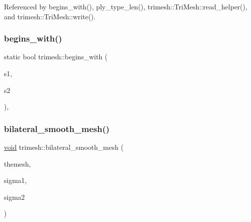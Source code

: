 Referenced by begins\+\_\+with(), ply\+\_\+type\+\_\+len(), trimesh\+::\+Tri\+Mesh\+::read\+\_\+helper(), and trimesh\+::\+Tri\+Mesh\+::write().

\mbox{\label{namespacetrimesh_a34d80be5fbd2f6df95fb17d680510222}} 
\subsubsection{\texorpdfstring{begins\+\_\+with()}{begins\_with()}\hspace{0.1cm}{\footnotesize\ttfamily [2/2]}}
{\footnotesize\ttfamily static bool trimesh\+::begins\+\_\+with (\begin{DoxyParamCaption}\item[{const \+::std\+::string \&}]{s1,  }\item[{const \+::std\+::string \&}]{s2 }\end{DoxyParamCaption})\hspace{0.3cm}{\ttfamily [inline]}, {\ttfamily [static]}}

\mbox{\label{namespacetrimesh_a7ceff7daca94fc7bdb7f39fdd7f4324b}} 
\subsubsection{\texorpdfstring{bilateral\+\_\+smooth\+\_\+mesh()}{bilateral\_smooth\_mesh()}}
{\footnotesize\ttfamily \hyperlink{namespacetrimesh_a784ddfd979e1c579bda795a8edfc3f43}{void} trimesh\+::bilateral\+\_\+smooth\+\_\+mesh (\begin{DoxyParamCaption}\item[{\hyperlink{classtrimesh_1_1TriMesh}{Tri\+Mesh} $\ast$}]{themesh,  }\item[{float}]{sigma1,  }\item[{float}]{sigma2 }\end{DoxyParamCaption})}

\mbox{\label{namespacetrimesh_af02cb5da4a7c6e10976858e904be4cc1}} 
